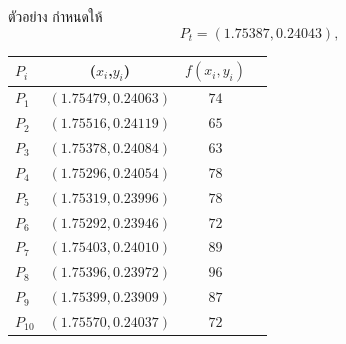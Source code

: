\documentclass[12pt,aspectratio=169]{beamer}
\begin{document}
\begin{frame}{ตัวอย่าง}
    กำหนดให้  \[P_t = (1.75387,0.24043), \]
    \begin{center}
        \begin{tabular}{lccc} 
        \hline
       $P_i$ & ($x_i$,$y_i$) &  $f(x_i,y_i)$ \\
        \hline
        $P_1$ &$(1.75479,0.24063)$ &$74$\\
        $P_2$ &$(1.75516,0.24119)$ &$65$\\
        $P_3$ &$(1.75378,0.24084)$ &$63$\\
        $P_4$ &$(1.75296,0.24054)$ &$78$\\
        $P_5$ &$(1.75319,0.23996)$ &$78$\\
        $P_6$ &$(1.75292,0.23946)$ &$72$\\
        $P_7$ &$(1.75403,0.24010)$ &$89$\\
        $P_8$ &$(1.75396,0.23972)$ &$96$\\
        $P_9$ &$(1.75399,0.23909)$ &$87$\\
        $P_{10}$ &$(1.75570,0.24037)$ &$72$\\
        \hline
        \end{tabular}
    \end{center}
\end{frame}

    
\end{document}

